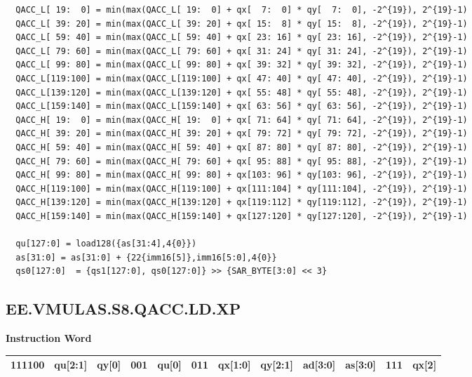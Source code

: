 \begin{lstlisting}
  QACC_L[ 19:  0] = min(max(QACC_L[ 19:  0] + qx[  7:  0] * qy[  7:  0], -2^{19}), 2^{19}-1)
  QACC_L[ 39: 20] = min(max(QACC_L[ 39: 20] + qx[ 15:  8] * qy[ 15:  8], -2^{19}), 2^{19}-1)
  QACC_L[ 59: 40] = min(max(QACC_L[ 59: 40] + qx[ 23: 16] * qy[ 23: 16], -2^{19}), 2^{19}-1)
  QACC_L[ 79: 60] = min(max(QACC_L[ 79: 60] + qx[ 31: 24] * qy[ 31: 24], -2^{19}), 2^{19}-1)
  QACC_L[ 99: 80] = min(max(QACC_L[ 99: 80] + qx[ 39: 32] * qy[ 39: 32], -2^{19}), 2^{19}-1)
  QACC_L[119:100] = min(max(QACC_L[119:100] + qx[ 47: 40] * qy[ 47: 40], -2^{19}), 2^{19}-1)
  QACC_L[139:120] = min(max(QACC_L[139:120] + qx[ 55: 48] * qy[ 55: 48], -2^{19}), 2^{19}-1)
  QACC_L[159:140] = min(max(QACC_L[159:140] + qx[ 63: 56] * qy[ 63: 56], -2^{19}), 2^{19}-1)
  QACC_H[ 19:  0] = min(max(QACC_H[ 19:  0] + qx[ 71: 64] * qy[ 71: 64], -2^{19}), 2^{19}-1)
  QACC_H[ 39: 20] = min(max(QACC_H[ 39: 20] + qx[ 79: 72] * qy[ 79: 72], -2^{19}), 2^{19}-1)
  QACC_H[ 59: 40] = min(max(QACC_H[ 59: 40] + qx[ 87: 80] * qy[ 87: 80], -2^{19}), 2^{19}-1)
  QACC_H[ 79: 60] = min(max(QACC_H[ 79: 60] + qx[ 95: 88] * qy[ 95: 88], -2^{19}), 2^{19}-1)
  QACC_H[ 99: 80] = min(max(QACC_H[ 99: 80] + qx[103: 96] * qy[103: 96], -2^{19}), 2^{19}-1)
  QACC_H[119:100] = min(max(QACC_H[119:100] + qx[111:104] * qy[111:104], -2^{19}), 2^{19}-1)
  QACC_H[139:120] = min(max(QACC_H[139:120] + qx[119:112] * qy[119:112], -2^{19}), 2^{19}-1)
  QACC_H[159:140] = min(max(QACC_H[159:140] + qx[127:120] * qy[127:120], -2^{19}), 2^{19}-1)

  qu[127:0] = load128({as[31:4],4{0}})
  as[31:0] = as[31:0] + {22{imm16[5]},imm16[5:0],4{0}}
  qs0[127:0]  = {qs1[127:0], qs0[127:0]} >> {SAR_BYTE[3:0] << 3}
\end{lstlisting}

\clearpage
\subsection{EE.VMULAS.S8.QACC.LD.XP}\label{instruction:EEVMULASS8QACCLDXP}
\setlength\tabcolsep{6pt}
\textbf{Instruction Word} \\
\begin{tabular}{|c|c|c|c|c|c|c|c|c|c|c|c|}
	\hline
	111100 & qu[2:1] & qy[0] & 001 & qu[0] & 011 & qx[1:0] & qy[2:1] & ad[3:0] & as[3:0] & 111 & qx[2] \\
	\hline
\end{tabular}

